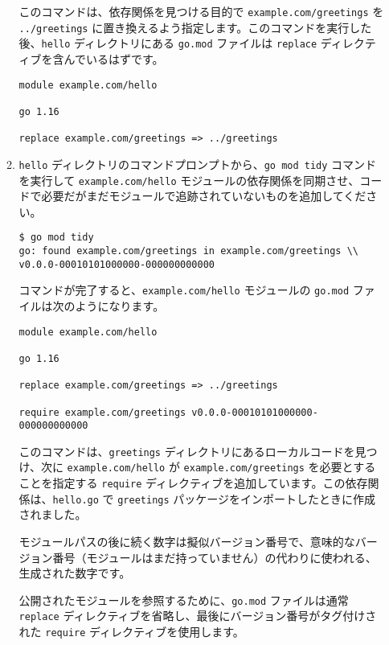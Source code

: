 \begin{enumerate}
\begin{enumerate}
このコマンドは、依存関係を見つける目的で \texttt{example.com/greetings} を \texttt{../greetings} に置き換えるよう指定します。このコマンドを実行した後、\texttt{hello} ディレクトリにある \texttt{go.mod} ファイルは \texttt{replace} ディレクティブを含んでいるはずです。

\begin{lstlisting}[numbers=none]
module example.com/hello

go 1.16

replace example.com/greetings => ../greetings
\end{lstlisting}

\item \texttt{hello} ディレクトリのコマンドプロンプトから、\texttt{go mod tidy} コマンドを実行して \texttt{example.com/hello} モジュールの依存関係を同期させ、コードで必要だがまだモジュールで追跡されていないものを追加してください。

\begin{lstlisting}[numbers=none]
$ go mod tidy
go: found example.com/greetings in example.com/greetings \\
v0.0.0-00010101000000-000000000000
\end{lstlisting}


コマンドが完了すると、\texttt{example.com/hello} モジュールの \texttt{go.mod} ファイルは次のようになります。

\begin{lstlisting}[numbers=none]
module example.com/hello

go 1.16

replace example.com/greetings => ../greetings

require example.com/greetings v0.0.0-00010101000000-000000000000
\end{lstlisting}

このコマンドは、\texttt{greetings} ディレクトリにあるローカルコードを見つけ、次に \texttt{example.com/hello} が \texttt{example.com/greetings} を必要とすることを指定する \texttt{require} ディレクティブを追加しています。この依存関係は、\texttt{hello.go} で \texttt{greetings} パッケージをインポートしたときに作成されました。

モジュールパスの後に続く数字は擬似バージョン番号で、意味的なバージョン番号（モジュールはまだ持っていません）の代わりに使われる、生成された数字です。

公開されたモジュールを参照するために、\texttt{go.mod} ファイルは通常 \texttt{replace} ディレクティブを省略し、最後にバージョン番号がタグ付けされた \texttt{require} ディレクティブを使用します。


\end{enumerate}
\end{enumerate}
